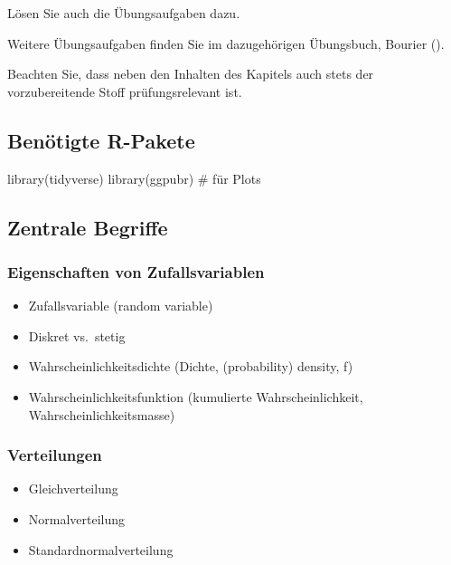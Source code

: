 \documentclass[
  ngerman,
  letterpaper,
  twoside,
  open=any]{scrbook}
\newenvironment{Shaded}{\begin{snugshade}}{\end{snugshade}}
\newcommand{\CommentTok}[1]{\textcolor[rgb]{0.37,0.37,0.37}{#1}}
\newcommand{\FunctionTok}[1]{\textcolor[rgb]{0.28,0.35,0.67}{#1}}
\newcommand{\NormalTok}[1]{\textcolor[rgb]{0.00,0.23,0.31}{#1}}
\providecommand{\tightlist}{%
  \setlength{\itemsep}{0pt}\setlength{\parskip}{0pt}}\usepackage{longtable,booktabs,array}
\theoremstyle{definition}
\theoremstyle{plain}
\theoremstyle{definition}
\theoremstyle{definition}
\theoremstyle{definition}
\theoremstyle{definition}
\theoremstyle{remark}
\begin{document}
Lösen Sie auch die Übungsaufgaben dazu.

Weitere Übungsaufgaben finden Sie im dazugehörigen Übungsbuch, Bourier
().

Beachten Sie, dass neben den Inhalten des Kapitels auch stets der
vorzubereitende Stoff prüfungsrelevant ist.

\subsection{Benötigte R-Pakete}\label{benuxf6tigte-r-pakete}

\begin{Shaded}
\begin{Highlighting}[]
\FunctionTok{library}\NormalTok{(tidyverse)}
\FunctionTok{library}\NormalTok{(ggpubr)  }\CommentTok{\# für Plots}
\end{Highlighting}
\end{Shaded}

\subsection{Zentrale Begriffe}\label{zentrale-begriffe}

\subsubsection{Eigenschaften von
Zufallsvariablen}\label{eigenschaften-von-zufallsvariablen}

\begin{itemize}
\tightlist
\item
  Zufallsvariable (random variable)
\item
  Diskret vs.~stetig
\item
  Wahrscheinlichkeitsdichte (Dichte, (probability) density, f)
\item
  Wahrscheinlichkeitsfunktion (kumulierte Wahrscheinlichkeit,
  Wahrscheinlichkeitsmasse)
\end{itemize}

\subsubsection{Verteilungen}\label{verteilungen-1}

\begin{itemize}
\tightlist
\item
  Gleichverteilung
\item
  Normalverteilung
\item
  Standardnormalverteilung
\end{itemize}
\end{document}
